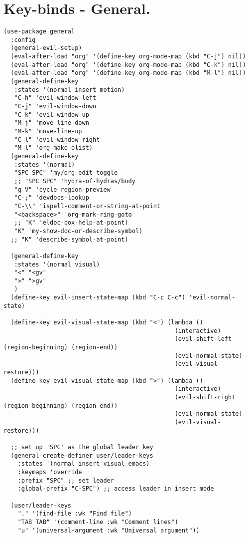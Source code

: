 \documentclass[11pt]{article}
\begin{document}
\section{Key-binds - General.}
\label{sec:org0b50b5c}
\begin{verbatim}
(use-package general
  :config
  (general-evil-setup)
  (eval-after-load "org" '(define-key org-mode-map (kbd "C-j") nil))
  (eval-after-load "org" '(define-key org-mode-map (kbd "C-k") nil))
  (eval-after-load "org" '(define-key org-mode-map (kbd "M-l") nil))
  (general-define-key
   :states '(normal insert motion)
   "C-h" 'evil-window-left
   "C-j" 'evil-window-down
   "C-k" 'evil-window-up
   "M-j" 'move-line-down
   "M-k" 'move-line-up
   "C-l" 'evil-window-right
   "M-l" 'org-make-olist)
  (general-define-key
   :states '(normal)
   "SPC SPC" 'my/org-edit-toggle
   ;; "SPC SPC" 'hydra-of-hydras/body
   "g V" 'cycle-region-preview
   "C-;" 'devdocs-lookup
   "C-\\" 'ispell-comment-or-string-at-point
   "<backspace>" 'org-mark-ring-goto
   ;; "K" 'eldoc-box-help-at-point)
   "K" 'my-show-doc-or-describe-symbol)
  ;; "K" 'describe-symbol-at-point) 

  (general-define-key
   :states '(normal visual)
   "<" "<gv"
   ">" ">gv"
   )
  (define-key evil-insert-state-map (kbd "C-c C-c") 'evil-normal-state)

  (define-key evil-visual-state-map (kbd "<") (lambda ()
                                                (interactive)
                                                (evil-shift-left (region-beginning) (region-end))
                                                (evil-normal-state)
                                                (evil-visual-restore)))
  (define-key evil-visual-state-map (kbd ">") (lambda ()
                                                (interactive)
                                                (evil-shift-right (region-beginning) (region-end))
                                                (evil-normal-state)
                                                (evil-visual-restore)))

  ;; set up 'SPC' as the global leader key
  (general-create-definer user/leader-keys
    :states '(normal insert visual emacs)
    :keymaps 'override
    :prefix "SPC" ;; set leader
    :global-prefix "C-SPC") ;; access leader in insert mode

  (user/leader-keys
    "." '(find-file :wk "Find file")
    "TAB TAB" '(comment-line :wk "Comment lines")
    "u" '(universal-argument :wk "Universal argument"))


\end{verbatim}
\end{document}
